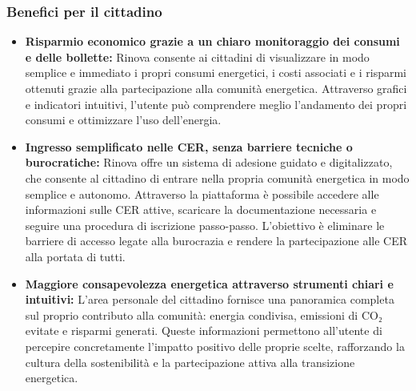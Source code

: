 \subsubsection*{Benefici per il cittadino}
\begin{itemize}
    \item \textbf{Risparmio economico grazie a un chiaro monitoraggio dei consumi e delle bollette:}  
    Rinova consente ai cittadini di visualizzare in modo semplice e immediato i propri consumi energetici, i costi associati e i risparmi ottenuti grazie alla partecipazione alla comunità energetica.  
    Attraverso grafici e indicatori intuitivi, l’utente può comprendere meglio l’andamento dei propri consumi e ottimizzare l’uso dell’energia.
    
    \item \textbf{Ingresso semplificato nelle CER, senza barriere tecniche o burocratiche:}  
    Rinova offre un sistema di adesione guidato e digitalizzato, che consente al cittadino di entrare nella propria comunità energetica in modo semplice e autonomo.  
    Attraverso la piattaforma è possibile accedere alle informazioni sulle CER attive, scaricare la documentazione necessaria e seguire una procedura di iscrizione passo-passo.  
    L’obiettivo è eliminare le barriere di accesso legate alla burocrazia e rendere la partecipazione alle CER alla portata di tutti.
    
    \item \textbf{Maggiore consapevolezza energetica attraverso strumenti chiari e intuitivi:}  
    L’area personale del cittadino fornisce una panoramica completa sul proprio contributo alla comunità: energia condivisa, emissioni di CO₂ evitate e risparmi generati.  
    Queste informazioni permettono all’utente di percepire concretamente l’impatto positivo delle proprie scelte, rafforzando la cultura della sostenibilità e la partecipazione attiva alla transizione energetica.
\end{itemize}

